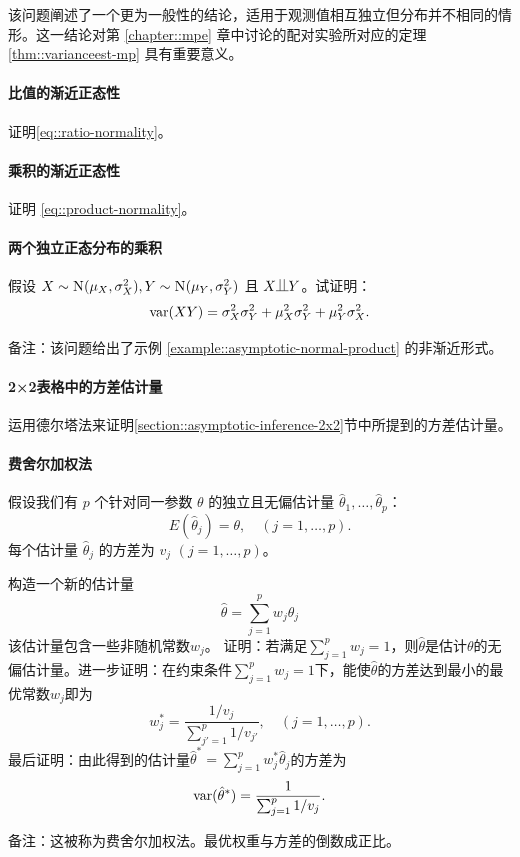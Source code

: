 该问题阐述了一个更为一般性的结论，适用于观测值相互独立但分布并不相同的情形。这一结论对第 \ref{chapter::mpe} 章中讨论的配对实验所对应的定理 \ref{thm::varianceest-mp} 具有重要意义。 





\paragraph{比值的渐近正态性}\label{hw::asymptotic-normality-ratio}


证明\eqref{eq::ratio-normality}。


\paragraph{乘积的渐近正态性}\label{hw::asymptotic-normality-product}


证明 \eqref{eq::product-normality}。


\paragraph{两个独立正态分布的乘积}\label{hw-product-Normals}

假设 $X\sim \textsc{N}(\mu_X, \sigma_X^2), Y\sim \textsc{N}(\mu_Y, \sigma_Y^2)$ 且 $X\ind Y$。试证明：
$$
\textup{var}(XY) = \sigma_X^2 \sigma_Y^2 +\mu_X^2 \sigma_Y^2 + \mu_Y^2 \sigma_X^2 .
$$



备注：该问题给出了示例 \ref{example::asymptotic-normal-product} 的非渐近形式。 




\paragraph{ 2×2表格中的方差估计量}\label{hw::variance-estimators-2x2}

运用德尔塔法来证明\ref{section::asymptotic-inference-2x2}节中所提到的方差估计量。 




\paragraph{费舍尔加权法}\label{hw::fisher-weighting}


假设我们有 $p$ 个针对同一参数 $\theta$ 的独立且无偏估计量 $\hat{\theta}_1, \ldots, \hat{\theta}_p$：
$$
E(\hat{\theta}_j) = \theta,\quad (j=1,\ldots, p).
$$
每个估计量 $\hat{\theta}_j$ 的方差为 $v_j$ $(j=1,\ldots, p)$。 

构造一个新的估计量$$
\hat{\theta} = \sum_{j=1}^p w_j \hat{\theta}_j
$$该估计量包含一些非随机常数$w_j$。  
证明：若满足$\sum_{j=1}^p w_j = 1$，则$\hat{\theta} $是估计$\theta$的无偏估计量。进一步证明：在约束条件$\sum_{j=1}^p w_j = 1$下，能使$\hat{\theta} $的方差达到最小的最优常数$w_j$即为$$
w_j^* =  \frac{1/v_j}{ \sum_{j'=1}^p   1/v_{j'} }, \quad (j=1,\ldots, p).
$$  
最后证明：由此得到的估计量$\hat{\theta}^* = \sum_{j=1}^p w_j^* \hat{\theta}_j$的方差为$$
\textup{var}(\hat{\theta}^*) =  \frac{1 }{ \sum_{j=1}^p   1/v_{j} }. 
$$


备注：这被称为费舍尔加权法。最优权重与方差的倒数成正比。 


